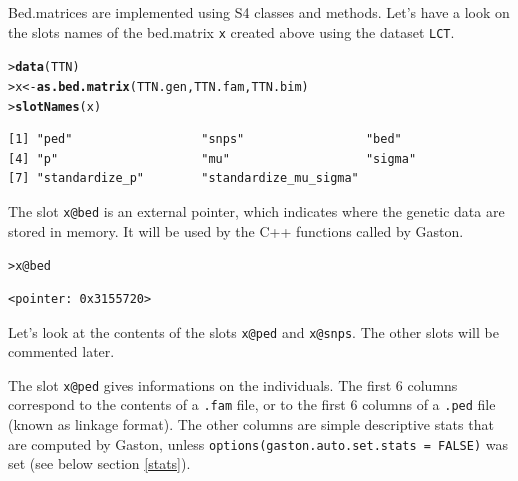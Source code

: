 \documentclass{article}\usepackage[]{graphicx}\usepackage[]{color}
\makeatletter
\newcommand{\hlopt}[1]{\textcolor[rgb]{0,0,0}{#1}}%
\newcommand{\hlstd}[1]{\textcolor[rgb]{0.345,0.345,0.345}{#1}}%
\newcommand{\hlkwb}[1]{\textcolor[rgb]{0.69,0.353,0.396}{#1}}%
\newcommand{\hlkwc}[1]{\textcolor[rgb]{0.333,0.667,0.333}{#1}}%
\newcommand{\hlkwd}[1]{\textcolor[rgb]{0.737,0.353,0.396}{\textbf{#1}}}%
\newenvironment{kframe}{%
 \def\at@end@of@kframe{}%
 \ifinner\ifhmode%
  \def\at@end@of@kframe{\end{minipage}}%
  \begin{minipage}{\columnwidth}%
 \fi\fi%
 \def\FrameCommand##1{\hskip\@totalleftmargin \hskip-\fboxsep
 \colorbox{shadecolor}{##1}\hskip-\fboxsep
     \hskip-\linewidth \hskip-\@totalleftmargin \hskip\columnwidth}%
 \MakeFramed {\advance\hsize-\width
   \@totalleftmargin\z@ \linewidth\hsize
   \@setminipage}}%
 {\par\unskip\endMakeFramed%
 \at@end@of@kframe}
\newenvironment{knitrout}{}{} %
\makeatother
\begin{document}
  Bed.matrices are implemented using S4 classes and methods.
  Let's have a look on the slots names of the bed.matrix \verb!x! created above using the dataset \verb!LCT!.

\begin{knitrout}
\color{fgcolor}\begin{kframe}
\begin{alltt}
\hlstd{> }\hlkwd{data}\hlstd{(TTN)}
\hlstd{> }\hlstd{x} \hlkwb{<-} \hlkwd{as.bed.matrix}\hlstd{(TTN.gen, TTN.fam, TTN.bim)}
\hlstd{> }\hlkwd{slotNames}\hlstd{(x)}
\end{alltt}
\begin{verbatim}
[1] "ped"                  "snps"                 "bed"                 
[4] "p"                    "mu"                   "sigma"               
[7] "standardize_p"        "standardize_mu_sigma"
\end{verbatim}
\end{kframe}
\end{knitrout}

  The slot \verb!x@bed! is an external pointer, which indicates where the genetic data are stored in
  memory. It will be used by the C++ functions called by Gaston. 
\begin{knitrout}
\color{fgcolor}\begin{kframe}
\begin{alltt}
\hlstd{> }\hlstd{x}\hlopt{@}\hlkwc{bed}
\end{alltt}
\begin{verbatim}
<pointer: 0x3155720>
\end{verbatim}
\end{kframe}
\end{knitrout}

  Let's look at the contents of the slots \verb!x@ped! and \verb!x@snps!.
  The other slots will be commented later.

  The slot \verb!x@ped! gives informations on the individuals. 
  The first 6 columns correspond to the contents of a \verb!.fam! file, or to the first 6 columns of a \verb!.ped! file 
  (known as linkage format). The other columns are simple descriptive
  stats that are computed by Gaston, unless \verb!options(gaston.auto.set.stats = FALSE)!
  was set (see below section \ref{stats}).
\end{document}
